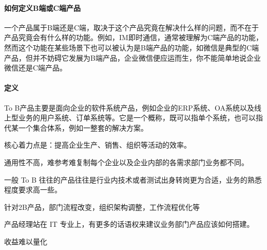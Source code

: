 \documentclass[letterpaper,11pt,english]{sphinxmanual}
\begin{document}
\paragraph{如何定义B端或C端产品}
\label{\detokenize{chapter_introduction/2B:bc}}
一个产品属于B端还是C端，取决于这个产品究竟在解决什么样的问题，而不在于产品究竟会有什么样的功能。例如，IM即时通信，通常被理解为C端产品的功能，然而这个功能在某些场景下也可以被认为是B端产品的功能，如微信是典型的C端产品，但并不妨碍它发展为B端产品，企业微信便应运而生，你不能简单地说企业微信还是C端产品。
%
\begin{footnote}[11]\sphinxAtStartFootnote
{}
%
\end{footnote}


\paragraph{定义}
\label{\detokenize{chapter_introduction/2B:id1}}
To
B产品主要是面向企业的软件系统产品，例如企业的ERP系统、OA系统以及线上型业务的用户系统、订单系统等。它是一个概称，既可以指单个系统，也可以指代某一个集合体系，例如一整套的解决方案。

核心着力点是：提高企业生产、销售、组织等活动的效率。

通用性不高，难参考难复制每个企业以及企业内部的各需求部门业务都不同。

一般 To B
往往的产品往往是行业内技术或者测试出身转岗更为合适，业务的熟悉程度要求高一些。
%
\begin{footnote}[12]\sphinxAtStartFootnote
{}
%
\end{footnote}

针对2B产品，部门流程改变，组织架构调整，工作流程优化等
%
\begin{footnote}[13]\sphinxAtStartFootnote
{}
%
\end{footnote} 产品经理站在 IT
专业上，有更多的话语权来建议业务部门产品应该如何搭建。
%
\begin{footnote}[14]\sphinxAtStartFootnote
{}
%
\end{footnote} 收益难以量化
\end{document}
